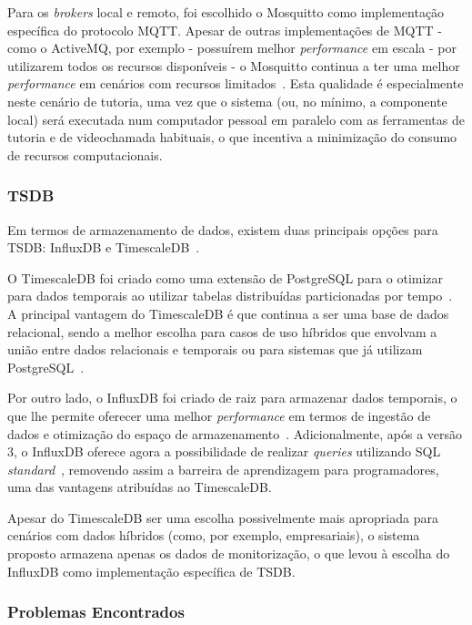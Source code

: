Para os \textit{brokers} local e remoto, foi escolhido o Mosquitto como implementação específica do protocolo \ac{MQTT}.
Apesar de outras implementações de \ac{MQTT} - como o ActiveMQ, por exemplo - possuírem melhor \textit{performance} em escala - por utilizarem todos os recursos disponíveis - o Mosquitto continua a ter uma melhor \textit{performance} em cenários com recursos limitados~\cite{Mishra2021}.
Esta qualidade é especialmente neste cenário de tutoria, uma vez que o sistema (ou, no mínimo, a componente local) será executada num computador pessoal em paralelo com as ferramentas de tutoria e de videochamada habituais, o que incentiva a minimização do consumo de recursos computacionais.

\subsubsection{\ac{TSDB}}

Em termos de armazenamento de dados, existem duas principais opções para \ac{TSDB}: InfluxDB e TimescaleDB~\cite{influxdata2026,OctaByte2025}.

O TimescaleDB foi criado como uma extensão de PostgreSQL para o otimizar para dados temporais ao utilizar tabelas distribuídas particionadas por tempo~\cite{influxdata2026}.
A principal vantagem do TimescaleDB é que continua a ser uma base de dados relacional, sendo a melhor escolha para casos de uso híbridos que envolvam a união entre dados relacionais e temporais ou para sistemas que já utilizam PostgreSQL~\cite{OctaByte2025,influxdata2026}.

Por outro lado, o InfluxDB foi criado de raiz para armazenar dados temporais, o que lhe permite oferecer uma melhor \textit{performance} em termos de ingestão de dados e otimização do espaço de armazenamento~\cite{OctaByte2025}.
Adicionalmente, após a versão 3, o InfluxDB oferece agora a possibilidade de realizar \textit{queries} utilizando \ac{SQL} \textit{standard}~\cite{influxdata2026}, removendo assim a barreira de aprendizagem para programadores, uma das vantagens atribuídas ao TimescaleDB.

Apesar do TimescaleDB ser uma escolha possivelmente mais apropriada para cenários com dados híbridos (como, por exemplo, empresariais), o sistema proposto armazena apenas os dados de monitorização, o que levou à escolha do InfluxDB como implementação específica de \ac{TSDB}.

\subsubsection{Problemas Encontrados}

